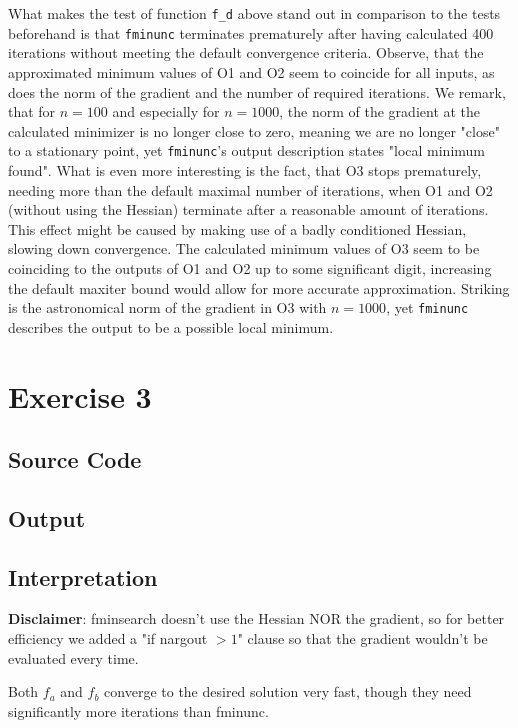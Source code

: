 \documentclass{article}
\begin{document}
        What makes the test of function \texttt{f\_d} above stand out in comparison to the tests beforehand is that \texttt{fminunc} terminates prematurely after having calculated 400 iterations without meeting the default convergence criteria. Observe, that the approximated minimum values of O1 and O2 seem to coincide for all inputs, as does the norm of the gradient and the number of required iterations. We remark, that for $n=100$  and especially for $n=1000$, the norm of the gradient at the calculated minimizer is no longer close to zero, meaning we are no longer "close" to a stationary point, yet \texttt{fminunc}'s output description states "local minimum found". What is even more interesting is the fact, that O3 stops prematurely, needing more than the default maximal number of iterations, when O1 and O2 (without using the Hessian) terminate after a reasonable amount of iterations. This effect might be caused by making use of a badly conditioned Hessian, slowing down convergence. The calculated minimum values of O3 seem to be coinciding to the outputs of O1 and O2 up to some significant digit, increasing the default maxiter bound would allow for more accurate approximation. Striking is the astronomical norm of the gradient in O3 with $n=1000$, yet \texttt{fminunc} describes the output to be a possible local minimum.

	
	\section{Exercise 3}
    \subsection{Source Code}
	

    \subsection{Output}
	
	
    \subsection{Interpretation}
    \textbf{Disclaimer}: fminsearch doesn't use the Hessian NOR the gradient, so for better efficiency we added a "if nargout $> 1$" clause so that the gradient wouldn't be evaluated every time.
    
    Both $f_a$ and $f_b$ converge to the desired solution very fast, though they need significantly more iterations than fminunc.
\end{document}
